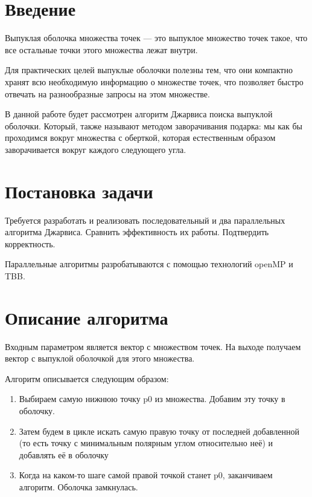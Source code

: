 \documentclass{report}
\begin{document}
\setcounter{page}{2}

\tableofcontents
\newpage

\section*{Введение}
\par Выпуклая оболочка множества точек — это выпуклое множество точек такое, что все остальные точки этого множества лежат внутри.
\par Для практических целей выпуклые оболочки полезны тем, что они компактно хранят всю необходимую информацию о множестве точек, что позволяет быстро отвечать на разнообразные запросы на этом множестве.
\par  В данной работе будет рассмотрен алгоритм Джарвиса поиска выпуклой оболочки. Который, также называют методом заворачивания подарка: мы как бы проходимся вокруг множества с оберткой, которая естественным образом заворачивается вокруг каждого следующего угла.
\newpage

\section*{Постановка задачи}
\par Требуется разработать и реализовать последовательный и два параллельных алгоритма Джарвиса. Сравнить эффективность их работы. Подтвердить корректность. 
\par Параллельные алгоритмы разробатываются с помощью технологий openMP и TBB. 
\newpage

\section*{Описание алгоритма}
Входным параметром является вектор с множеством точек. На выходе получаем вектор с выпуклой оболочкой для этого множества. \par 
Алгоритм описывается следующим образом: \par

\begin{enumerate}
\item Выбираем самую нижнюю точку p0 из множества. Добавим эту точку в оболочку.
\item Затем будем в цикле искать самую правую точку от последней добавленной (то есть точку с минимальным полярным углом относительно неё) и добавлять её в оболочку
\item Когда на каком-то шаге самой правой точкой станет p0, заканчиваем алгоритм. Оболочка замкнулась. 

\end{enumerate}
\newpage
\end{document}
